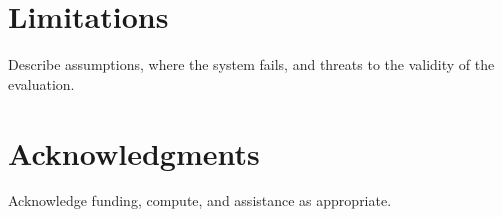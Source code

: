 \documentclass[10pt,twocolumn]{article}
\begin{document}
\twocolumn[{%
\begin{@twocolumnfalse}
  \uiuceditorialtitle
\end{@twocolumnfalse}
}]






\section*{Limitations}
Describe assumptions, where the system fails, and threats to the validity of the evaluation.

\section*{Acknowledgments}
Acknowledge funding, compute, and assistance as appropriate.




\appendix

\end{document}
